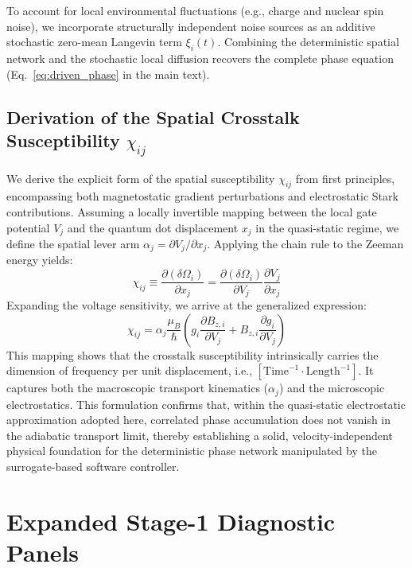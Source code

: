 \documentclass[a4paper,twocolumn,11pt]{quantumarticle}
\begin{document}
To account for local environmental fluctuations (e.g., charge and nuclear spin noise), we incorporate structurally independent noise sources as an additive stochastic zero-mean Langevin term $\xi_i(t)$. Combining the deterministic spatial network and the stochastic local diffusion recovers the complete phase equation (Eq.~\eqref{eq:driven_phase} in the main text).

\subsection{Derivation of the Spatial Crosstalk Susceptibility $\chi_{ij}$}

We derive the explicit form of the spatial susceptibility $\chi_{ij}$ from first principles, encompassing both magnetostatic gradient perturbations and electrostatic Stark contributions. Assuming a locally invertible mapping between the local gate potential $V_j$ and the quantum dot displacement $x_j$ in the quasi-static regime, we define the spatial lever arm $\alpha_j = \partial V_j / \partial x_j$. Applying the chain rule to the Zeeman energy yields:
\begin{equation}
    \chi_{ij} \equiv \frac{\partial (\delta\Omega_i)}{\partial x_j} = \frac{\partial (\delta\Omega_i)}{\partial V_j} \frac{\partial V_j}{\partial x_j}
\end{equation}
Expanding the voltage sensitivity, we arrive at the generalized expression:
\begin{equation}
    \chi_{ij} = \alpha_j \frac{\mu_B}{\hbar} \left( g_i \frac{\partial B_{z,i}}{\partial V_j} + B_{z,i} \frac{\partial g_i}{\partial V_j} \right)
\end{equation}
This mapping shows that the crosstalk susceptibility intrinsically carries the dimension of frequency per unit displacement, i.e., $[\text{Time}^{-1} \cdot \text{Length}^{-1}]$. It captures both the macroscopic transport kinematics ($\alpha_j$) and the microscopic electrostatics. This formulation confirms that, within the quasi-static electrostatic approximation adopted here, correlated phase accumulation does not vanish in the adiabatic transport limit, thereby establishing a solid, velocity-independent physical foundation for the deterministic phase network manipulated by the surrogate-based software controller.


\section{Expanded Stage-1 Diagnostic Panels}
\label{app:stage1_full_summary}
\end{document}
